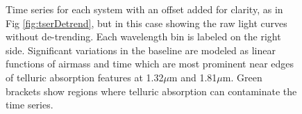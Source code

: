 \documentclass[twocolumn]{aastex6}
\begin{document}
\begin{figure}[!t]
\centering
{}
	\caption{Time series for each system with an offset added for clarity, as in Fig \ref{fig:tserDetrend}, but in this case showing the raw light curves without de-trending.
	Each wavelength bin is labeled on the right side. Significant variations in the baseline are modeled as linear functions of airmass and time which are most prominent near edges of telluric absorption features at 1.32$\mu$m and 1.81$\mu$m.
	Green brackets show regions where telluric absorption can contaminate the time series.}
	\label{fig:tserNoDetrend}
\end{figure} 
\end{document}
